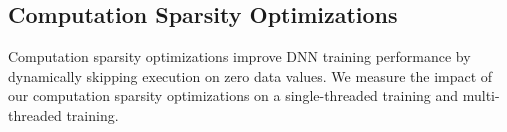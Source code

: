            

   
\subsection{Computation Sparsity Optimizations}
\label{subsec:perf_computation_sparsity}
Computation sparsity optimizations improve DNN training performance by dynamically skipping execution on zero data values.  We measure the impact of our computation sparsity optimizations on a single-threaded training and multi-threaded training. 

